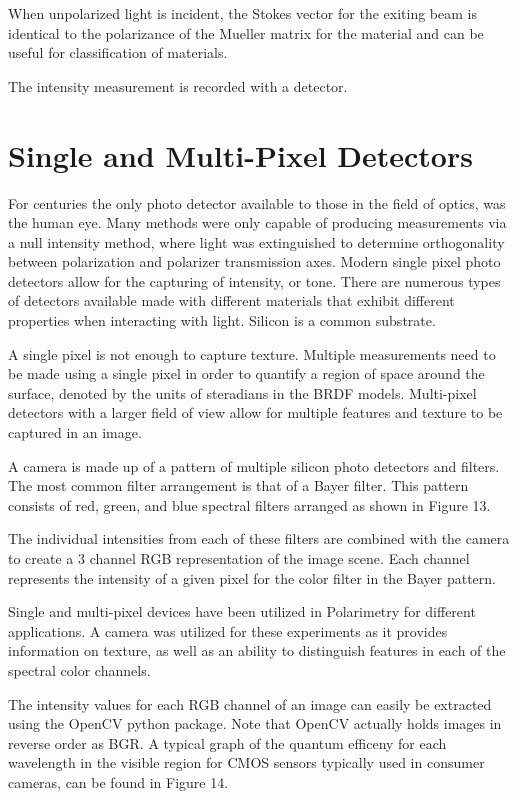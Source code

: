 When unpolarized light is incident, the Stokes vector for the exiting beam is identical to the polarizance of the Mueller matrix for the material and can be useful for classification of materials.

The intensity measurement is recorded with a detector.

\section{Single and Multi-Pixel Detectors}
For centuries the only photo detector available to those in the field of optics, was the human eye.  Many methods were only capable of producing measurements via a null intensity method, where light was extinguished to determine orthogonality between polarization and polarizer transmission axes.  Modern single pixel photo detectors allow for the capturing of intensity, or tone.  There are numerous types of detectors available made with different materials that exhibit different properties when interacting with light.  Silicon is a common substrate.

A single pixel is not enough to capture texture.  Multiple measurements need to be made using a single pixel in order to quantify a region of space around the surface, denoted by the units of steradians in the BRDF models.  Multi-pixel detectors with a larger field of view allow for multiple features and texture to be captured in an image.

A camera is made up of a pattern of multiple silicon photo detectors and filters.  The most common filter arrangement is that of a Bayer filter.  This pattern consists of red, green, and blue spectral filters arranged as shown in Figure 13.

The individual intensities from each of these filters are combined with the camera to create a 3 channel RGB representation of the image scene.  Each channel represents the intensity of a given pixel for the color filter in the Bayer pattern.

Single and multi-pixel devices have been utilized in Polarimetry for different applications.  A camera was utilized for these experiments as it provides information on texture, as well as an ability to distinguish features in each of the spectral color channels.

The intensity values for each RGB channel of an image can easily be extracted using the OpenCV python package.  Note that OpenCV actually holds images in reverse order as BGR.  A typical graph of the quantum efficeny for each wavelength in the visible region for CMOS sensors typically used in consumer cameras, can be found in Figure 14.

